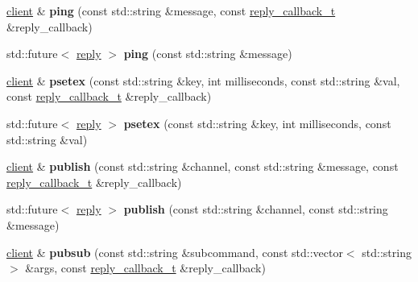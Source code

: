 \begin{DoxyCompactItemize}
\item 
\mbox{\label{classcpp__redis_1_1client_a399c32f46d82d844b661647f64d9fb97}} 
\hyperlink{classcpp__redis_1_1client}{client} \& {\bfseries ping} (const std\+::string \&message, const \hyperlink{classcpp__redis_1_1client_a061a1140d36d2eaeda82b09a0bb3f9f2}{reply\+\_\+callback\+\_\+t} \&reply\+\_\+callback)
\item 
\mbox{\label{classcpp__redis_1_1client_a5efa4ecc6b105a2464b22cd873caae39}} 
std\+::future$<$ \hyperlink{classcpp__redis_1_1reply}{reply} $>$ {\bfseries ping} (const std\+::string \&message)
\item 
\mbox{\label{classcpp__redis_1_1client_a732ba849342f9d8c67111f6cb6cb198c}} 
\hyperlink{classcpp__redis_1_1client}{client} \& {\bfseries psetex} (const std\+::string \&key, int milliseconds, const std\+::string \&val, const \hyperlink{classcpp__redis_1_1client_a061a1140d36d2eaeda82b09a0bb3f9f2}{reply\+\_\+callback\+\_\+t} \&reply\+\_\+callback)
\item 
\mbox{\label{classcpp__redis_1_1client_a69712c925c1496ab9531a5fd1888ad93}} 
std\+::future$<$ \hyperlink{classcpp__redis_1_1reply}{reply} $>$ {\bfseries psetex} (const std\+::string \&key, int milliseconds, const std\+::string \&val)
\item 
\mbox{\label{classcpp__redis_1_1client_a1fba121a3d6e50811448e35917badfc6}} 
\hyperlink{classcpp__redis_1_1client}{client} \& {\bfseries publish} (const std\+::string \&channel, const std\+::string \&message, const \hyperlink{classcpp__redis_1_1client_a061a1140d36d2eaeda82b09a0bb3f9f2}{reply\+\_\+callback\+\_\+t} \&reply\+\_\+callback)
\item 
\mbox{\label{classcpp__redis_1_1client_ad9a8434b4ca46e185bab45cf135c9ac2}} 
std\+::future$<$ \hyperlink{classcpp__redis_1_1reply}{reply} $>$ {\bfseries publish} (const std\+::string \&channel, const std\+::string \&message)
\item 
\mbox{\label{classcpp__redis_1_1client_a4c606e08e8787971044b76930b99f30d}} 
\hyperlink{classcpp__redis_1_1client}{client} \& {\bfseries pubsub} (const std\+::string \&subcommand, const std\+::vector$<$ std\+::string $>$ \&args, const \hyperlink{classcpp__redis_1_1client_a061a1140d36d2eaeda82b09a0bb3f9f2}{reply\+\_\+callback\+\_\+t} \&reply\+\_\+callback)

\end{DoxyCompactItemize}
